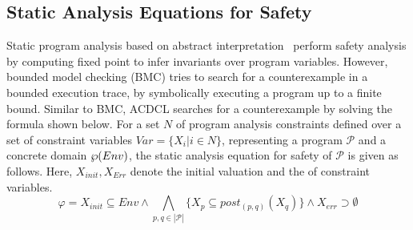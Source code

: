 \subsection{Static Analysis Equations for Safety}
Static program analysis based on abstract interpretation~\cite{DBLP:conf/emsoft/Cousot07} 
perform safety analysis by computing fixed point to infer invariants 
over program variables.  However, bounded model checking (BMC) tries to search 
for a counterexample in a bounded execution trace, by symbolically executing a 
program up to a finite bound.  
Similar to BMC, ACDCL searches for a counterexample by solving the formula shown below.
For a set $N$ of program analysis constraints defined over a set 
of constraint variables $Var = \{X_i| i \in N\}$, representing a program
$\mathcal{P}$ and a concrete domain $\wp(Env)$, the static analysis equation 
for safety of $\mathcal{P}$ is given as follows.  Here, $X_{init}, X_{Err}$ denote the initial valuation 
and the  of constraint variables.
\[\varphi = X_{init} \subseteq Env \wedge \underset{p,q \in |\mathcal{P}|}
{\bigwedge} \{ X_p \subseteq post_{(p,q)}(X_q) \} \wedge X_{err} \supset \emptyset \] 
